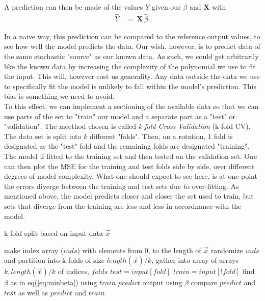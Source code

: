 \documentclass[ 12pt, a4paper ]{article}
\begin{document}
A prediction can then be made of the values $Y$ given our $\beta$ and $\mathbf{X}$ with
\begin{align}
    \hat{Y} \,&=\, \mathbf{X}\,\hat{\beta}.
\end{align}

In a naive way, this prediction can be compared to the reference output values, to see how
well the model predicts the data. Our wish, however, is to predict data of the same stochastic
"source" as our known data. As such, we could get arbitrarily like the known data by 
increasing the complexity of the polynomial we use to fit the input. This will, however cost us
generality. Any data outside the data we use to specifically fit the model is unlikely to fall 
within the model's prediction. This bias is something we need to avoid.\\

To this effect, we can implement a sectioning of the available data so that we can use parts of
the set to "train" our model and a separate part as a "test" or "validation".
The meethod chosen is called \textit{k-fold Cross Validation} (k-fold CV).
The data set is split into $k$ different "folds". Then, on a rotation, 1 fold is designated as
the "test" fold and the remaining folds are designated "training". The model if fitted to the 
training set and then tested on the validation set. One can then plot the MSE for the training 
and test folds side by side, over different degrees of model complexity. What one should expect
to see here, is at one point the errors diverge between the training and test sets due to 
over-fitting. As mentioned above, the model predicts closer and closer the set used to train, 
but sets that diverge from the training are less and less in accordnance with the model.
\begin{algorithm}
\caption{k fold split based on input data $\vec{x}$ }
\begin{algorithmic}
\STATE  make index array ($inds$) with elements from $0$, to the length of $\vec{x}$
\STATE  randomize $inds$ and partition into k folds of size $length(\vec{x})/k$, 
\STATE  gather into array of arrays $k, length(\vec{x})/k$ of indices, $folds$
\STATE  $test = input[fold]$
\STATE  $train = input[!fold]$
\STATE  find $\beta$ as in eq(\ref{eq:minbeta}) using $train$
\STATE  $predict$ output using $\beta$
\STATE  compare $predict$ and $test$ as well as $predict$ and $train$
\ENDFOR
\end{algorithmic}
\end{algorithm}
\end{document}
